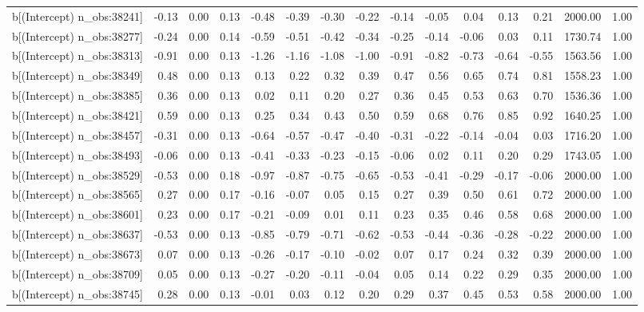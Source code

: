 \begin{table}[ht]
\begin{tabular}{rrrrrrrrrrrrrrr}
  b[(Intercept) n\_obs:38241] & -0.13 & 0.00 & 0.13 & -0.48 & -0.39 & -0.30 & -0.22 & -0.14 & -0.05 & 0.04 & 0.13 & 0.21 & 2000.00 & 1.00 \\ 
  b[(Intercept) n\_obs:38277] & -0.24 & 0.00 & 0.14 & -0.59 & -0.51 & -0.42 & -0.34 & -0.25 & -0.14 & -0.06 & 0.03 & 0.11 & 1730.74 & 1.00 \\ 
  b[(Intercept) n\_obs:38313] & -0.91 & 0.00 & 0.13 & -1.26 & -1.16 & -1.08 & -1.00 & -0.91 & -0.82 & -0.73 & -0.64 & -0.55 & 1563.56 & 1.00 \\ 
  b[(Intercept) n\_obs:38349] & 0.48 & 0.00 & 0.13 & 0.13 & 0.22 & 0.32 & 0.39 & 0.47 & 0.56 & 0.65 & 0.74 & 0.81 & 1558.23 & 1.00 \\ 
  b[(Intercept) n\_obs:38385] & 0.36 & 0.00 & 0.13 & 0.02 & 0.11 & 0.20 & 0.27 & 0.36 & 0.45 & 0.53 & 0.63 & 0.70 & 1536.36 & 1.00 \\ 
  b[(Intercept) n\_obs:38421] & 0.59 & 0.00 & 0.13 & 0.25 & 0.34 & 0.43 & 0.50 & 0.59 & 0.68 & 0.76 & 0.85 & 0.92 & 1640.25 & 1.00 \\ 
  b[(Intercept) n\_obs:38457] & -0.31 & 0.00 & 0.13 & -0.64 & -0.57 & -0.47 & -0.40 & -0.31 & -0.22 & -0.14 & -0.04 & 0.03 & 1716.20 & 1.00 \\ 
  b[(Intercept) n\_obs:38493] & -0.06 & 0.00 & 0.13 & -0.41 & -0.33 & -0.23 & -0.15 & -0.06 & 0.02 & 0.11 & 0.20 & 0.29 & 1743.05 & 1.00 \\ 
  b[(Intercept) n\_obs:38529] & -0.53 & 0.00 & 0.18 & -0.97 & -0.87 & -0.75 & -0.65 & -0.53 & -0.41 & -0.29 & -0.17 & -0.06 & 2000.00 & 1.00 \\ 
  b[(Intercept) n\_obs:38565] & 0.27 & 0.00 & 0.17 & -0.16 & -0.07 & 0.05 & 0.15 & 0.27 & 0.39 & 0.50 & 0.61 & 0.72 & 2000.00 & 1.00 \\ 
  b[(Intercept) n\_obs:38601] & 0.23 & 0.00 & 0.17 & -0.21 & -0.09 & 0.01 & 0.11 & 0.23 & 0.35 & 0.46 & 0.58 & 0.68 & 2000.00 & 1.00 \\ 
  b[(Intercept) n\_obs:38637] & -0.53 & 0.00 & 0.13 & -0.85 & -0.79 & -0.71 & -0.62 & -0.53 & -0.44 & -0.36 & -0.28 & -0.22 & 2000.00 & 1.00 \\ 
  b[(Intercept) n\_obs:38673] & 0.07 & 0.00 & 0.13 & -0.26 & -0.17 & -0.10 & -0.02 & 0.07 & 0.17 & 0.24 & 0.32 & 0.39 & 2000.00 & 1.00 \\ 
  b[(Intercept) n\_obs:38709] & 0.05 & 0.00 & 0.13 & -0.27 & -0.20 & -0.11 & -0.04 & 0.05 & 0.14 & 0.22 & 0.29 & 0.35 & 2000.00 & 1.00 \\ 
  b[(Intercept) n\_obs:38745] & 0.28 & 0.00 & 0.13 & -0.01 & 0.03 & 0.12 & 0.20 & 0.29 & 0.37 & 0.45 & 0.53 & 0.58 & 2000.00 & 1.00 \\ 

\end{tabular}
\end{table}
